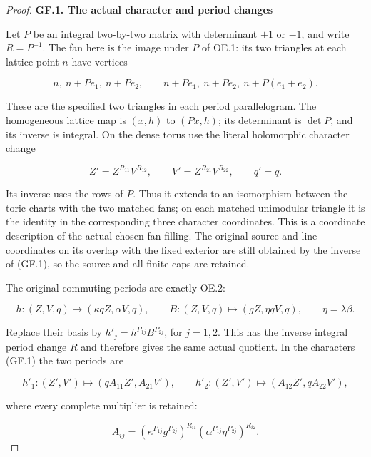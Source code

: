 \begin{proof}
\par

\medskip\noindent\textbf{GF.1. The actual character and period changes}

\par\nobreak

Let \(P\) be an integral two-by-two matrix with determinant \(+1\) or \(-1\), and
write \(R=P^{-1}\). The fan here is the image under \(P\) of OE.1: its two
triangles at each lattice point \(n\) have vertices

\[
 n,\ n+Pe_1,\ n+Pe_2,
 \qquad n+Pe_1,\ n+Pe_2,\ n+P(e_1+e_2).
\]

These are the specified two triangles in each period parallelogram.
The homogeneous lattice map is \((x,h)\) to \((Px,h)\); its determinant is
\(\det P\), and its inverse is integral. On the dense torus use the literal
holomorphic character change

\[
 Z'=Z^{R_{11}}V^{R_{12}},\qquad
 V'=Z^{R_{21}}V^{R_{22}},\qquad q'=q.                 \tag{GF.1}
\]

Its inverse uses the rows of \(P\). Thus it extends to an isomorphism
between the toric charts with the two matched fans; on each matched
unimodular triangle it is the identity in the corresponding three
character coordinates. This is a coordinate description of the actual
chosen fan filling. The original source and line coordinates on its
overlap with the fixed exterior are still obtained by the inverse of
(GF.1), so the source and all finite caps are retained.

The original commuting periods are exactly OE.2:

\[
 h:(Z,V,q)\longmapsto(\kappa qZ,\alpha V,q),\qquad
 B:(Z,V,q)\longmapsto(gZ,\eta qV,q),\qquad\eta=\lambda\beta.
\]

Replace their basis by \(h'_j=h^{P_{1j}}B^{P_{2j}}\), for \(j=1,2\).
This has the inverse integral period change \(R\) and therefore gives
the same actual quotient. In the characters (GF.1) the two periods
are

\[
 h'_1:(Z',V')\longmapsto(qA_{11}Z',A_{21}V'),\qquad
 h'_2:(Z',V')\longmapsto(A_{12}Z',qA_{22}V'),           \tag{GF.2}
\]

where every complete multiplier is retained:

\[
 A_{ij}=(\kappa^{P_{1j}}g^{P_{2j}})^{R_{i1}}
                (\alpha^{P_{1j}}\eta^{P_{2j}})^{R_{i2}}.
                                                               \tag{GF.3}
\]


\end{proof}
